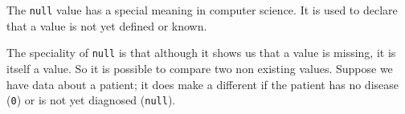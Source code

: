 
The {\tt null} value has a special meaning in computer science. It is used
to declare that a value is not yet defined or known.

The speciality of {\tt null} is that although it shows us that a value
is missing, it is itself a value. So it is possible to compare two non
existing values. Suppose we have data about a patient; it does make a
different if the patient has no disease ({\tt 0}) or is not yet
diagnosed ({\tt null}).


